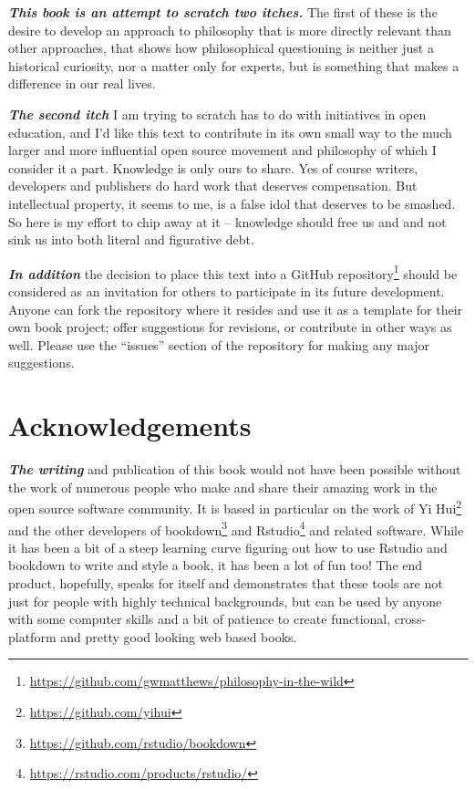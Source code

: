 \documentclass[
  12pt, openany]{book}
\renewcommand{\href}[2]{#2\footnote{\url{#1}}}
\begin{document}
\textbf{\emph{This book is an attempt to scratch two itches.}} The first of these is the desire to develop an approach to philosophy that is more directly relevant than other approaches, that shows how philosophical questioning is neither just a historical curiosity, nor a matter only for experts, but is something that makes a difference in our real lives.

\textbf{\emph{The second itch}} I am trying to scratch has to do with initiatives in open education, and I'd like this text to contribute in its own small way to the much larger and more influential open source movement and philosophy of which I consider it a part. Knowledge is only ours to share. Yes of course writers, developers and publishers do hard work that deserves compensation. But intellectual property, it seems to me, is a false idol that deserves to be smashed. So here is my effort to chip away at it -- knowledge should free us and and not sink us into both literal and figurative debt.

\textbf{\emph{In addition}} the decision to place this text into a \href{https://github.com/gwmatthews/philosophy-in-the-wild}{GitHub repository} should be considered as an invitation for others to participate in its future development. Anyone can fork the repository where it resides and use it as a template for their own book project; offer suggestions for revisions, or contribute in other ways as well. Please use the ``issues'' section of the repository for making any major suggestions.

\hypertarget{acknowledgements}{%
\section*{Acknowledgements}\label{acknowledgements}}


\textbf{\emph{The writing}} and publication of this book would not have been possible without the work of numerous people who make and share their amazing work in the open source software community. It is based in particular on the work of \href{https://github.com/yihui}{Yi Hui} and the other developers of \href{https://github.com/rstudio/bookdown}{bookdown} and \href{https://rstudio.com/products/rstudio/}{Rstudio} and related software. While it has been a bit of a steep learning curve figuring out how to use Rstudio and bookdown to write and style a book, it has been a lot of fun too! The end product, hopefully, speaks for itself and demonstrates that these tools are not just for people with highly technical backgrounds, but can be used by anyone with some computer skills and a bit of patience to create functional, cross-platform and pretty good looking web based books.
\end{document}
